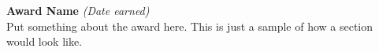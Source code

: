 \documentclass[class=article, crop=false]{standalone}
\begin{document}
\textbf{Award Name} \textsl{(Date earned)} \\
Put something about the award here. This is just a sample of 
how a section would look like.
\end{document}
